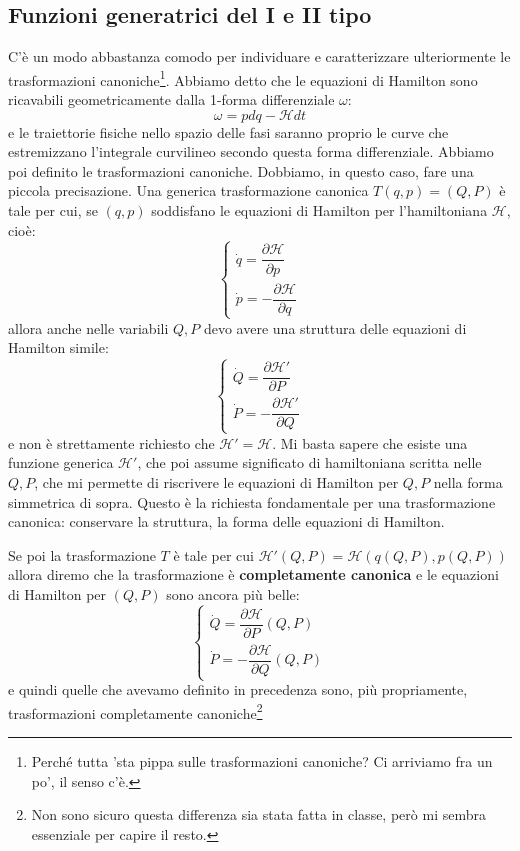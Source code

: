 \documentclass[a4paper,openany]{article}
\begin{document}
	\subsection{Funzioni generatrici del I e II tipo}
	C'è un modo abbastanza comodo per individuare e caratterizzare ulteriormente le trasformazioni canoniche\footnote{Perché tutta 'sta pippa sulle trasformazioni canoniche? Ci arriviamo fra un po', il senso c'è.}. Abbiamo detto che le equazioni di Hamilton sono ricavabili geometricamente dalla 1-forma differenziale $\omega$:
	$$
	\omega = pdq-\mathcal{H}dt
	$$
	e le traiettorie fisiche nello spazio delle fasi saranno proprio le curve che estremizzano l'integrale curvilineo secondo questa forma differenziale. Abbiamo poi definito le trasformazioni canoniche. Dobbiamo, in questo caso, fare una piccola precisazione. Una generica trasformazione canonica $T(q,p) = (Q,P)$ è tale per cui, se $(q,p)$ soddisfano le equazioni di Hamilton per l'hamiltoniana $\mathcal{H}$, cioè:
	\begin{equation}\label{key}
		\begin{cases}
			\dot{q} = \dfrac{\partial \mathcal{H}}{\partial p} \\
			\dot{p} = -\dfrac{\partial \mathcal{H}}{\partial q}
		\end{cases}
	\end{equation}
	allora anche nelle variabili $Q,P$ devo avere una struttura delle equazioni di Hamilton simile:
	\begin{equation}\label{key}
		\begin{cases}
			\dot{Q} = \dfrac{\partial \mathcal{H}'}{\partial P} \\
			\dot{P} = -\dfrac{\partial \mathcal{H}'}{\partial Q}
		\end{cases}
	\end{equation}
	e non è strettamente richiesto che $\mathcal{H}' = \mathcal{H}$. Mi basta sapere che esiste una funzione generica $\mathcal{H}'$, che poi assume significato di hamiltoniana scritta nelle $Q,P$, che mi permette di riscrivere le equazioni di Hamilton per $Q,P$ nella forma simmetrica di sopra. Questo è la richiesta fondamentale per una trasformazione canonica: conservare la struttura, la forma delle equazioni di Hamilton. 
	
	Se poi la trasformazione $T$ è tale per cui $\mathcal{H}'(Q,P) = \mathcal{H}(q(Q,P),p(Q,P))$ allora diremo che la trasformazione è \textbf{completamente canonica} e le equazioni di Hamilton per $(Q,P)$ sono ancora più belle:
	\begin{equation}\label{key}
		\begin{cases}
			\dot{Q} = \dfrac{\partial \mathcal{H}}{\partial P}(Q,P) \\
			\dot{P} = -\dfrac{\partial \mathcal{H}}{\partial Q}(Q,P)
		\end{cases}
	\end{equation}
	e quindi quelle che avevamo definito in precedenza sono, più propriamente, trasformazioni completamente canoniche\footnote{Non sono sicuro questa differenza sia stata fatta in classe, però mi sembra essenziale per capire il resto.}
	
\end{document}
